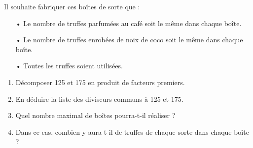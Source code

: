 \documentclass[14 pt]{extarticle}
\theoremstyle{plain}
\begin{document}
 Il souhaite fabriquer ces boîtes de sorte que :
\begin{itemize}
\item[•]Le nombre de truffes parfumées au café soit le même dans chaque boîte.
\item[•]Le nombre de truffes enrobées de noix de coco soit le même dans chaque boîte.
\item[•]Toutes les truffes soient utilisées.
\end{itemize}

\begin{enumerate}
\item Décomposer 125 et 175 en produit de facteurs premiers.
\item En déduire la liste des diviseurs communs à 125 et 175.
\item Quel nombre maximal de boîtes pourra-t-il réaliser ?
\item Dans ce cas, combien y aura-t-il de truffes de chaque sorte dans chaque boîte ?
\end{enumerate}
\end{document}
